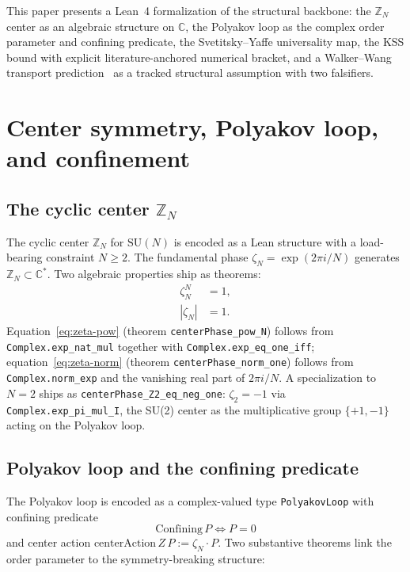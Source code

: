 \documentclass[twocolumn]{revtex4-2}
\newcommand{\Polyakov}{P}
\begin{document}
This paper presents a Lean~4 formalization of the structural backbone:
the $\mathbb{Z}_N$ center as an algebraic structure on $\mathbb{C}$,
the Polyakov loop as the complex order parameter and confining
predicate, the Svetitsky--Yaffe universality map, the KSS bound with
explicit literature-anchored numerical bracket, and a Walker--Wang
transport prediction~\cite{HofmanIqbal2018} as a tracked structural
assumption with two falsifiers.

\section{Center symmetry, Polyakov loop, and confinement}
\label{sec:center}

\subsection{The cyclic center $\mathbb{Z}_N$}

The cyclic center $\mathbb{Z}_N$ for $\mathrm{SU}(N)$ is encoded as a
Lean structure with a load-bearing constraint $N \ge 2$. The
fundamental phase $\zeta_N = \exp(2\pi i / N)$ generates
$\mathbb{Z}_N \subset \mathbb{C}^{\ast}$. Two algebraic properties
ship as theorems:
\begin{align}
\zeta_N^N &= 1, \label{eq:zeta-pow} \\
|\zeta_N| &= 1. \label{eq:zeta-norm}
\end{align}
Equation~\eqref{eq:zeta-pow} (theorem
\texttt{centerPhase\_pow\_N}) follows from
\texttt{Complex.exp\_nat\_mul} together with
\texttt{Complex.exp\_eq\_one\_iff}; equation~\eqref{eq:zeta-norm}
(theorem \texttt{centerPhase\_norm\_one}) follows from
\texttt{Complex.norm\_exp} and the vanishing real part of
$2\pi i / N$. A specialization to $N = 2$ ships as
\texttt{centerPhase\_Z2\_eq\_neg\_one}: $\zeta_2 = -1$ via
\texttt{Complex.exp\_pi\_mul\_I}, the SU(2) center as the
multiplicative group $\{+1, -1\}$ acting on the Polyakov loop.

\subsection{Polyakov loop and the confining predicate}

The Polyakov loop is encoded as a complex-valued type
\texttt{PolyakovLoop} with confining predicate
\begin{equation}
\mathrm{Confining}\,\Polyakov \iff \Polyakov = 0
\label{eq:confining}
\end{equation}
and center action
$\mathrm{centerAction}\,Z\,\Polyakov := \zeta_N \cdot \Polyakov$. Two
substantive theorems link the order parameter to the symmetry-breaking
structure:
\end{document}
